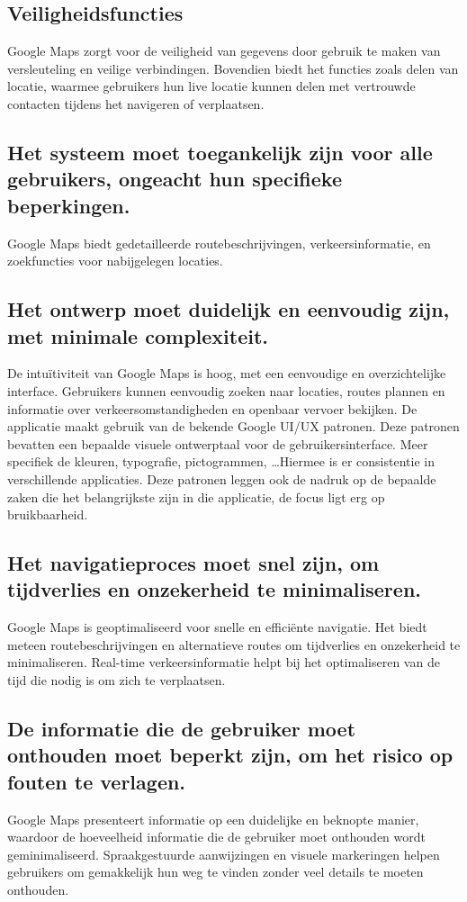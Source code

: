 \subsection*{Veiligheidsfuncties}
Google Maps zorgt voor de veiligheid van gegevens door gebruik te maken van versleuteling en veilige verbindingen. Bovendien biedt het functies zoals delen van locatie, waarmee gebruikers hun live locatie kunnen delen met vertrouwde contacten tijdens het navigeren of verplaatsen.

\subsection*{Het systeem moet toegankelijk zijn voor alle gebruikers, ongeacht hun specifieke beperkingen.}
Google Maps biedt gedetailleerde routebeschrijvingen, verkeersinformatie, en zoekfuncties voor nabijgelegen locaties.
\subsection*{Het ontwerp moet duidelijk en eenvoudig zijn, met minimale complexiteit.}
De intuïtiviteit van Google Maps is hoog, met een eenvoudige en overzichtelijke interface. Gebruikers kunnen eenvoudig zoeken naar locaties, routes plannen en informatie over verkeersomstandigheden en openbaar vervoer bekijken. De applicatie maakt gebruik van de bekende Google UI/UX patronen. Deze patronen bevatten een bepaalde visuele ontwerptaal voor de gebruikersinterface. Meer specifiek de kleuren, typografie, pictogrammen, \ldots Hiermee is er consistentie in verschillende applicaties. Deze patronen leggen ook de nadruk op de bepaalde zaken die het belangrijkste zijn in die applicatie, de focus ligt erg op bruikbaarheid.
\subsection*{Het navigatieproces moet snel zijn, om tijdverlies en onzekerheid te minimaliseren.}
Google Maps is geoptimaliseerd voor snelle en efficiënte navigatie. Het biedt meteen routebeschrijvingen en alternatieve routes om tijdverlies en onzekerheid te minimaliseren. Real-time verkeersinformatie helpt bij het optimaliseren van de tijd die nodig is om zich te verplaatsen.
\subsection*{De informatie die de gebruiker moet onthouden moet beperkt zijn, om het risico op fouten te verlagen.}
Google Maps presenteert informatie op een duidelijke en beknopte manier, waardoor de hoeveelheid informatie die de gebruiker moet onthouden wordt geminimaliseerd. Spraakgestuurde aanwijzingen en visuele markeringen helpen gebruikers om gemakkelijk hun weg te vinden zonder veel details te moeten onthouden.
